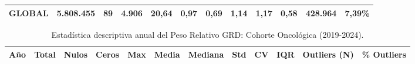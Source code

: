 \begin{table}[htbp]
\begin{tabular}{|c|c|c|c|c|c|c|c|c|c|c|c|}
\parbox[t]{1cm}{\centering\textbf{GLOBAL}} & \parbox[t]{1.3cm}{\raggedleft\textbf{5.808.455}} & \parbox[t]{1.0cm}{\raggedleft\textbf{89}} & \parbox[t]{1.0cm}{\raggedleft\textbf{4.906}} & \parbox[t]{1.1cm}{\raggedleft\textbf{20,64}} & \parbox[t]{1.0cm}{\raggedleft\textbf{0,97}} & \parbox[t]{1.2cm}{\raggedleft\textbf{0,69}} & \parbox[t]{1.0cm}{\raggedleft\textbf{1,14}} & \parbox[t]{1.0cm}{\raggedleft\textbf{1,17}} & \parbox[t]{1.0cm}{\raggedleft\textbf{0,58}} & \parbox[t]{1.5cm}{\raggedleft\textbf{428.964}} & \parbox[t]{1.5cm}{\raggedleft\textbf{7,39\%}} \\ \hline
\end{tabular}
\end{table}

\begin{table}[htbp]
\centering
\scriptsize
\setlength{\tabcolsep}{2pt}
\renewcommand{\arraystretch}{1.2}
\caption{Estadística descriptiva anual del Peso Relativo GRD: Cohorte Oncológica (2019-2024).}
\label{tab:estadisticas_peso_onco}
\begin{tabular}{|c|c|c|c|c|c|c|c|c|c|c|c|}
\hline
\parbox[t]{1cm}{\centering\textbf{Año}} & 
\parbox[t]{1cm}{\centering\textbf{Total}} & 
\parbox[t]{1.0cm}{\centering\textbf{Nulos}} & 
\parbox[t]{1.0cm}{\centering\textbf{Ceros}} & 
\parbox[t]{1.1cm}{\centering\textbf{Max}} & 
\parbox[t]{1.0cm}{\centering\textbf{Media}} & 
\parbox[t]{1.2cm}{\centering\textbf{Mediana}} & 
\parbox[t]{1.0cm}{\centering\textbf{Std}} & 
\parbox[t]{1.0cm}{\centering\textbf{CV}} & 
\parbox[t]{1.0cm}{\centering\textbf{IQR}} & 
\parbox[t]{1.5cm}{\centering\textbf{Outliers (N)}} & 
\parbox[t]{1.5cm}{\centering\textbf{\% Outliers}} \\ \hline


\end{tabular}
\end{table}

